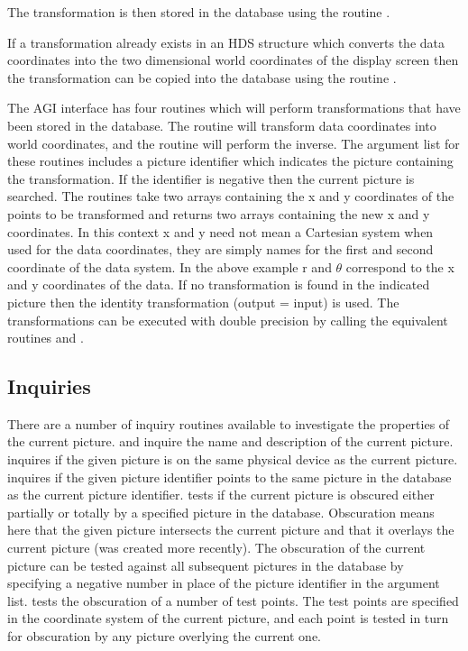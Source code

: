\documentclass[twoside,11pt,nolof]{starlink}
\begin{document}
The transformation is then stored in the database using the routine
.

If a transformation already exists in an HDS structure which converts
the data coordinates into the two dimensional world coordinates of the
display screen then the transformation can be copied into the database
using the routine .

The AGI interface has four routines which will perform transformations
that have been stored in the database. The routine
will transform data coordinates into world coordinates, and the routine
 will perform the inverse.
The argument list for these routines includes a picture identifier which
indicates the picture containing the transformation. If the identifier is
negative then the current picture is searched.
The routines take two arrays containing the x and y coordinates of the
points to be transformed and returns two arrays containing the new
x and y coordinates. In this context x and y need not mean a
Cartesian system when used for the data coordinates, they are simply
names for the first and second coordinate of the data system. In the above
example r and $\theta$ correspond to the x and y coordinates of the
data. If no transformation is found in the indicated picture then the
identity transformation (output = input) is used. The transformations
can be executed with double precision by calling the equivalent routines
 and .

\subsection{Inquiries}
There are a number of inquiry routines available to investigate the properties
of the current picture.
 and
 inquire the name and description of the
current picture.
 inquires if the given picture is on
the same physical device as the current picture.
 inquires if the given picture identifier
points to the same picture in the database as the current picture identifier.
 tests if the current picture is
obscured either partially or totally by a specified picture in the database.
Obscuration means here that the given picture intersects the current picture
and that it overlays the current picture (was created more recently).
The obscuration of the current picture can be tested against all subsequent
pictures in the database by specifying a negative number in place of the
picture identifier in the argument list.
 tests the obscuration of a number
of test points.
The test points are specified in the coordinate system of the current picture,
and each point is tested in turn for obscuration by any picture overlying the
current one.
\end{document}
